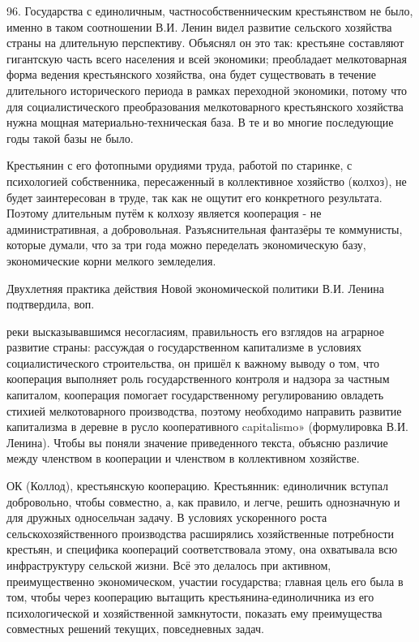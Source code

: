96. Государства с единоличным, частнособственническим крестьянством не было, именно в таком соотношении В.И. Ленин видел развитие сельского хозяйства страны на длительную перспективу. Объяснял он это так: крестьяне составляют гигантскую часть всего населения и всей экономики; преобладает мелкотоварная форма ведения крестьянского хозяйства, она будет существовать в течение длительного исторического периода в рамках переходной экономики, потому что для социалистического преобразования мелкотоварного крестьянского хозяйства нужна мощная материально-техническая база. В те и во многие последующие годы такой базы не было.

Крестьянин с его фотопными орудиями труда, работой по старинке, с психологией собственника, пересаженный в коллективное хозяйство (колхоз), не будет заинтересован в труде, так как не ощутит его конкретного результата. Поэтому длительным путём к колхозу является кооперация - не административная, а добровольная. Разъяснительная фантазёры те коммунисты, которые думали, что за три года можно переделать экономическую базу, экономические корни мелкого земледелия.

Двухлетняя практика действия Новой экономической политики В.И. Ленина подтвердила, воп.

реки высказывавшимся несогласиям, правильность его взглядов на аграрное развитие страны: рассуждая о государственном капитализме в условиях социалистического строительства, он пришёл к важному выводу о том, что кооперация выполняет роль государственного контроля и надзора за частным капиталом, кооперация помогает государственному регулированию овладеть стихией мелкотоварного производства, поэтому необходимо направить развитие капитализма в деревне в русло кооперативного capitalismo» (формулировка В.И. Ленина). Чтобы вы поняли значение приведенного текста, объясню различие между членством в кооперации и членством в коллективном хозяйстве.

ОК (Коллод), крестьянскую кооперацию. Крестьянник: единоличник вступал добровольно, чтобы совместно, а, как правило, и легче, решить однозначную и для дружных односельчан задачу. В условиях ускоренного роста сельскохозяйственного производства расширялись хозяйственные потребности крестьян, и специфика коопераций соответствовала этому, она охватывала всю инфраструктуру сельской жизни. Всё это делалось при активном, преимущественно экономическом, участии государства; главная цель его была в том, чтобы через кооперацию вытащить крестьянина-единоличника из его психологической и хозяйственной замкнутости, показать ему преимущества совместных решений текущих, повседневных задач.

